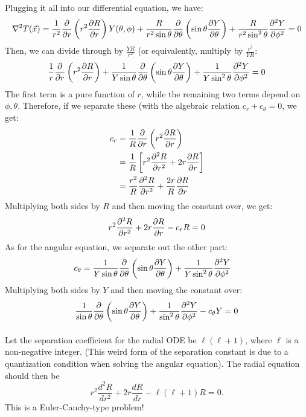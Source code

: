 \documentclass{article}
\begin{document}
\begin{solution}
	Plugging it all into our differential equation, we have:
	\[
		\nabla^2 T(\vec x) = \frac{1}{r^2}\pdv{r}\left( r^2 \pdv{R}{r} \right) Y(\theta, \phi) 
		+ \frac{R}{r^2 \sin \theta }\pdv{\theta}\left( \sin \theta \pdv{Y}{\theta} \right) 
		+ \frac{R}{r^2 \sin^2 \theta}\pdv[2]{Y}{\phi} = 0
	\] 
	Then, we can divide through by $\frac{YR}{r^2}$ (or equivalently, multiply by $\frac{r^2}{YR}$:
	\begin{align*}
		\frac{1}{r}\pdv{r}\left( r^2 \pdv{R}{r} \right) 
		+ \frac{1}{Y \sin \theta}\pdv{\theta}\left( \sin \theta \pdv{Y}{\theta} \right) 
		+ \frac{1}{Y \sin^2 \theta }\pdv[2]{Y}{\phi} = 0
	\end{align*}
	The first term is a pure function of $r$, while the remaining two terms depend on $\phi, \theta$. 
	Therefore, if we separate these (with the algebraic relation $c_r + c_\theta = 0$, we get:
	\begin{align*}
		c_r &= \frac{1}{R}\pdv{r}\left( r^2 \pdv{R}{r} \right)  \\
			&= \frac{1}{R}\left[r^2 \pdv[2]{R}{r} + 2r \pdv{R}{r}\right] \\
			&= \frac{r^2}{R}\pdv[2]{R}{r} + \frac{2r}{R}\pdv{R}{r} 
	\end{align*}
	Multiplying both sides by $R$ and then moving the constant over, we get:
	\[
		r^2 \pdv[2]{R}{r} + 2r \pdv{R}{r} - c_r R = 0
	\] 
	As for the angular equation, we separate out the other part:
	\begin{align*}
		c_\theta &= \frac{1}{Y\sin \theta}\pdv{\theta}\left( \sin \theta \pdv{Y}{\theta} \right) 
		+ \frac{1}{Y \sin^2 \theta} \pdv[2]{Y}{\phi}
	\end{align*}
	Multiplying both sides by $Y$ and then moving the constant over:
	\[
		\frac{1}{\sin \theta}\pdv{\theta}\left( \sin \theta \pdv{Y}{\theta} \right) 
		+ \frac{1}{\sin^2 \theta} \pdv[2]{Y}{\phi} - c_\theta Y = 0
	\] 
\end{solution}

\phline
\paragraph{}
Let the separation coefficient for the radial ODE be $\ell(\ell+1)$, where $\ell$ is a non-negative integer.  (This weird form of the separation constant is 
due to a quantization condition when solving the angular equation).  The radial equation should then be
	\begin{equation*}
		r^{2}\frac{d^{2}R}{dr^{2}} + 2r\frac{dR}{dr} - \ell(\ell+1)R = 0.
	\end{equation*}
This is a Euler-Cauchy-type problem!
\end{document}
